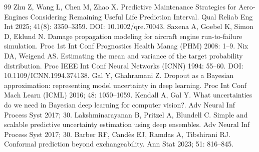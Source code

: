 \documentclass[11pt,a4paper]{article}
\begin{document}
\begin{thebibliography}{99}
 Zhu Z, Wang L, Chen M, Zhao X. Predictive Maintenance Strategies for Aero‐Engines Considering Remaining Useful Life Prediction Interval. Qual Reliab Eng Int 2025; 41(8): 3350–3359. DOI: 10.1002/qre.70043.
 Saxena A, Goebel K, Simon D, Eklund N. Damage propagation modeling for aircraft engine run-to-failure simulation. Proc 1st Int Conf Prognostics Health Manag (PHM) 2008: 1–9.
 Nix DA, Weigend AS. Estimating the mean and variance of the target probability distribution. Proc IEEE Int Conf Neural Networks (ICNN) 1994: 55–60. DOI: 10.1109/ICNN.1994.374138.
 Gal Y, Ghahramani Z. Dropout as a Bayesian approximation: representing model uncertainty in deep learning. Proc Int Conf Mach Learn (ICML) 2016; 48: 1050–1059.
 Kendall A, Gal Y. What uncertainties do we need in Bayesian deep learning for computer vision?. Adv Neural Inf Process Syst 2017; 30.
 Lakshminarayanan B, Pritzel A, Blundell C. Simple and scalable predictive uncertainty estimation using deep ensembles. Adv Neural Inf Process Syst 2017; 30.
 Barber RF, Candès EJ, Ramdas A, Tibshirani RJ. Conformal prediction beyond exchangeability. Ann Stat 2023; 51: 816–845.
\end{thebibliography}
\end{document}
